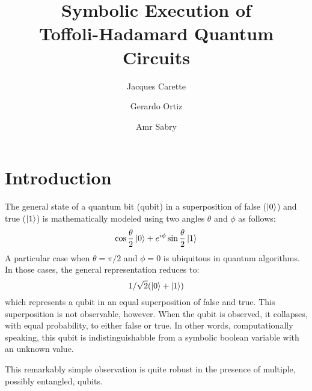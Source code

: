 \documentclass[sigplan]{acmart}
\begin{document}
\title{Symbolic Execution of \\
  Toffoli-Hadamard Quantum Circuits}

\author{Jacques Carette}

\author{Gerardo Ortiz}

\author{Amr Sabry}

\maketitle

\section{Introduction}

The general state of a quantum bit (qubit) in a superposition of false ($\ket{0}$) and true
($\ket{1}$) is mathematically modeled using two angles $\theta$ and
$\phi$ as follows:
\[
\cos{\frac{\theta}{2}} \ket{0} + e^{i\phi} \sin{\frac{\theta}{2}} \ket{1} 
\]
A particular case when $\theta = \pi/2$ and $\phi=0$ is ubiquitous in
quantum algorithms. In those cases, the general representation reduces to:
\[
1/\sqrt{2} (\ket{0} + \ket{1} )
\]
which represents a qubit in an equal superposition of false and
true. This superposition is not observable, however. When the qubit is
observed, it collapses, with equal probability, to either false or
true. In other words, computationally speaking, this qubit is
indistinguishabble from a symbolic boolean variable with an unknown
value.

This remarkably simple observation is quite robust in the presence of
multiple, possibly entangled, qubits. 
\end{document}
